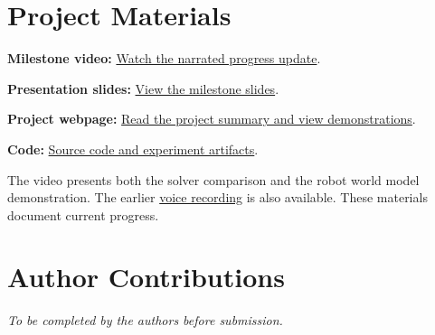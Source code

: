 \documentclass[sigconf]{acmart}
\begin{document}
\section*{Project Materials}
\noindent\textbf{Milestone video:} \href{https://jacobrlopez.github.io/cs284a-project/assets/videos/cs284-milestone-video.mp4}{Watch the narrated progress update}.\par
\noindent\textbf{Presentation slides:} \href{https://docs.google.com/presentation/d/10qQ5zAVu4HsRSvfzTfzSnumnGHDP_jmQl_tjDnVh7NU/edit}{View the milestone slides}.\par
\noindent\textbf{Project webpage:} \href{https://jacobrlopez.github.io/cs284a-project/}{Read the project summary and view demonstrations}.\par
\noindent\textbf{Code:} \href{https://github.com/charlesxu0124/284A-final-project}{Source code and experiment artifacts}.\par
The video presents both the solver comparison and the robot world model demonstration. The earlier \href{https://drive.google.com/file/d/1KOEwjS67DSdJb9yQWuCjANsEz6WcbaMj/view}{voice recording} is also available. These materials document current progress.

\section*{Author Contributions}
\textit{To be completed by the authors before submission.}


\end{document}
